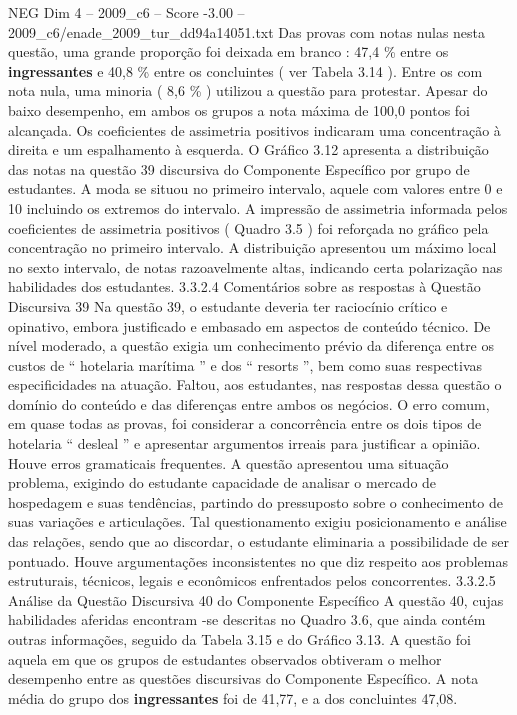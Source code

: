 \begin{textsample}{NEG Dim 4 – 2009\_c6 – Score -3.00 – 2009\_c6/enade\_2009\_tur\_dd94a14051.txt}
Das provas com notas nulas nesta questão, uma grande proporção foi deixada em branco : 47,4 \% entre os \textbf{ingressantes} e 40,8 \% entre os concluintes ( ver Tabela 3.14 ).
Entre os com nota nula, uma minoria ( 8,6 \% ) utilizou a questão para protestar.
Apesar do baixo desempenho, em ambos os grupos a nota máxima de 100,0 pontos foi alcançada.
Os coeficientes de assimetria positivos indicaram uma concentração à direita e um espalhamento à esquerda.
O Gráfico 3.12 apresenta a distribuição das notas na questão 39 discursiva do Componente Específico por grupo de estudantes.
A moda se situou no primeiro intervalo, aquele com valores entre 0 e 10 incluindo os extremos do intervalo.
A impressão de assimetria informada pelos coeficientes de assimetria positivos ( Quadro 3.5 ) foi reforçada no gráfico pela concentração no primeiro intervalo.
A distribuição apresentou um máximo local no sexto intervalo, de notas razoavelmente altas, indicando certa polarização nas habilidades dos estudantes. 3.3.2.4 Comentários sobre as respostas à Questão Discursiva 39 Na questão 39, o estudante deveria ter raciocínio crítico e opinativo, embora justificado e embasado em aspectos de conteúdo técnico.
De nível moderado, a questão exigia um conhecimento prévio da diferença entre os custos de “ hotelaria marítima ” e dos “ resorts ”, bem como suas respectivas especificidades na atuação.
Faltou, aos estudantes, nas respostas dessa questão o domínio do conteúdo e das diferenças entre ambos os negócios.
O erro comum, em quase todas as provas, foi considerar a concorrência entre os dois tipos de hotelaria “ desleal ” e apresentar argumentos irreais para justificar a opinião.
Houve erros gramaticais frequentes.
A questão apresentou uma situação problema, exigindo do estudante capacidade de analisar o mercado de hospedagem e suas tendências, partindo do pressuposto sobre o conhecimento de suas variações e articulações.
Tal questionamento exigiu posicionamento e análise das relações, sendo que ao discordar, o estudante eliminaria a possibilidade de ser pontuado.
Houve argumentações inconsistentes no que diz respeito aos problemas estruturais, técnicos, legais e econômicos enfrentados pelos concorrentes. 3.3.2.5 Análise da Questão Discursiva 40 do Componente Específico A questão 40, cujas habilidades aferidas encontram -se descritas no Quadro 3.6, que ainda contém outras informações, seguido da Tabela 3.15 e do Gráfico 3.13.
A questão foi aquela em que os grupos de estudantes observados obtiveram o melhor desempenho entre as questões discursivas do Componente Específico.
A nota média do grupo dos \textbf{ingressantes} foi de 41,77, e a dos concluintes 47,08.

\end{textsample}
